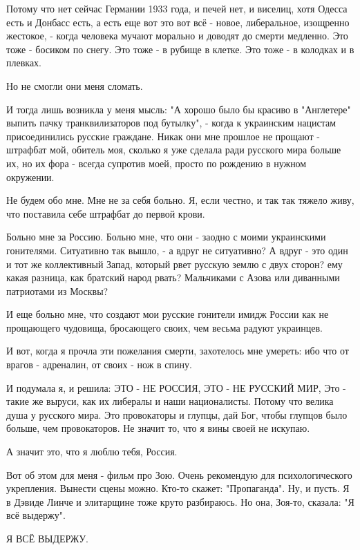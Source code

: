 Потому что нет сейчас Германии 1933 года, и печей нет, и виселиц, хотя Одесса
есть и Донбасс есть, а есть еще вот это вот всё - новое, либеральное, изощренно
жестокое, - когда человека мучают морально и доводят до смерти медленно. Это
тоже - босиком по снегу. Это тоже - в рубище в клетке. Это тоже - в колодках и
в плевках.

Но не смогли они меня сломать.

И тогда лишь возникла у меня мысль: "А хорошо было бы красиво в "Англетере"
выпить пачку транквилизаторов под бутылку", - когда к украинским нацистам
присоединились русские граждане. Никак они мне прошлое не прощают - штрафбат
мой, обитель моя, сколько я уже сделала ради русского мира больше их, но их
фора - всегда супротив моей, просто по рождению в нужном окружении.

Не будем обо мне. Мне не за себя больно. Я, если честно, и так так тяжело живу,
что поставила себе штрафбат до первой крови.

Больно мне за Россию. Больно мне, что они - заодно с моими украинскими
гонителями. Ситуативно так вышло, - а вдруг не ситуативно? А вдруг - это один и
тот же коллективный Запад, который рвет русскую землю с двух сторон? ему какая
разница, как братский народ рвать? Мальчиками с Азова или диванными патриотами
из Москвы?

И еще больно мне, что создают мои русские гонители имидж России как не
прощающего чудовища, бросающего своих, чем весьма радуют украинцев.

И вот, когда я прочла эти пожелания смерти, захотелось мне умереть: ибо что от
врагов - адреналин, от своих - нож в спину.

И подумала я, и решила: ЭТО - НЕ РОССИЯ, ЭТО - НЕ РУССКИЙ МИР, Это - такие же
выруси, как их либералы и наши националисты. Потому что велика душа у русского
мира. Это провокаторы и глупцы, дай Бог, чтобы глупцов было больше, чем
провокаторов. Не значит то, что я вины своей не искупаю.

А значит это, что я люблю тебя, Россия.

Вот об этом для меня - фильм про Зою. Очень рекомендую для психологического
укрепления. Вынести сцены можно. Кто-то скажет: "Пропаганда". Ну, и пусть. Я в
Дэвиде Линче и элитарщине тоже круто разбираюсь. Но она, Зоя-то, сказала: "Я
всё выдержу".

Я ВСЁ ВЫДЕРЖУ.

